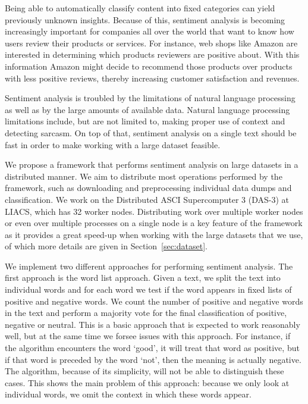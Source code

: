 \documentclass{article}
\begin{document}
Being able to automatically classify content into fixed categories can yield
previously unknown insights. Because of this, sentiment analysis is becoming
increasingly important for companies all over the world that want to know how
users review their products or services. For instance, web shops like Amazon
are interested in determining which products reviewers are positive about.
With this information Amazon might decide to recommend those products over
products with less positive reviews, thereby increasing customer satisfaction
and revenues.

Sentiment analysis is troubled by the limitations of natural language processing
as well as by the large amounts of available data. Natural language processing
limitations include, but are not limited to, making proper use of context and
detecting sarcasm. On top of that, sentiment analysis on a single text should be
fast in order to make working with a large dataset feasible.

We propose a framework that performs sentiment analysis on large datasets in a
distributed manner. We aim to distribute most operations performed by the 
framework, such as downloading and preprocessing individual data dumps and
classification. We work on the Distributed ASCI Supercomputer 3 (DAS-3) at
LIACS, which has 32 worker nodes. Distributing work over multiple worker nodes
or even over multiple processes on a single node is a key feature of the
framework as it provides a great speed-up when working with the large
datasets that we use, of which more details are given in
Section~\ref{sec:dataset}.

We implement two different approaches for performing sentiment analysis. The
first approach is the word list approach. Given a text, we split the text into
individual words and for each word we test if the word appears in fixed lists
of positive and negative words. We count the number of positive and negative
words in the text and perform a majority vote for the final classification
of positive, negative or neutral. This is a basic approach that is expected to
work reasonably well, but at the same time we forsee issues with this approach.
For instance, if the algorithm encounters the word `good', it will treat that
word as positive, but if that word is preceded by the word `not', then the
meaning is actually negative. The algorithm, because of its simplicity, will
not be able to distinguish these cases. This shows the main problem of this
approach: because we only look at individual words, we omit the context in
which these words appear.
\end{document}

